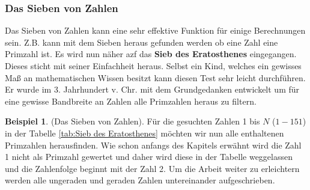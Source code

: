 \documentclass[12pt,a4paper]{article}
\theoremstyle{definition}
\newtheorem{bsp}{Beispiel}[subsection]
\begin{document}
\subsubsection{Das Sieben von Zahlen}\label{Das Sieben von Zahlen}
Das Sieben von Zahlen kann eine sehr effektive Funktion für einige Berechnungen sein.
Z.B. kann mit dem Sieben heraus gefunden werden ob eine Zahl eine Primzahl ist.
Es wird nun näher azf das \textbf{Sieb des Eratosthenes} eingegangen.
Dieses sticht mit seiner Einfachheit heraus.
Selbst ein Kind, welches ein gewisses Maß an mathematischen Wissen besitzt kann diesen Test sehr leicht durchführen.
Er wurde im 3. Jahrhundert v. Chr. mit dem Grundgedanken entwickelt um für eine gewisse Bandbreite an Zahlen alle Primzahlen heraus zu filtern.

\begin{bsp}(Das Sieben von Zahlen).\newline
Für die gesuchten Zahlen 1 bis $N$ ($1-151$) in der Tabelle \ref{tab:Sieb des Eratosthenes} möchten wir nun alle enthaltenen Primzahlen herausfinden.
Wie schon anfangs des Kapitels erwähnt wird die Zahl 1 nicht als Primzahl gewertet und daher wird diese in der Tabelle weggelassen und die Zahlenfolge beginnt mit der Zahl 2.
Um die Arbeit weiter zu erleichtern werden alle ungeraden und geraden Zahlen untereinander aufgeschrieben.


\end{bsp}
\end{document}
